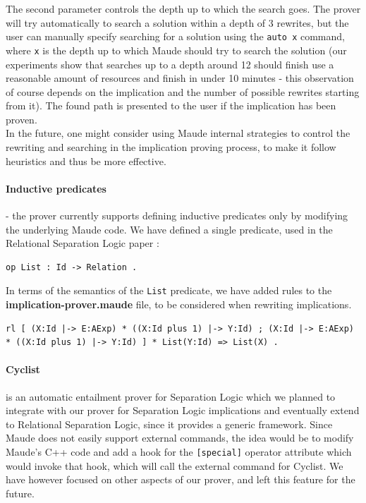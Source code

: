 \documentclass[12pt,a4paper]{article}
\begin{document}
{The second parameter controls the depth up to which the search goes. The prover will try automatically to search a solution within a depth of 3 rewrites, but the user can manually specify searching for a solution using the \texttt{auto x} command, where \texttt{x} is the depth up to which Maude should try to search the solution (our experiments show that searches up to a depth around 12 should finish use a reasonable amount of resources and finish in under 10 minutes - this observation of course depends on the implication and the number of possible rewrites starting from it). The found path is presented to the user if the implication has been proven. 
\\

In the future, one might consider using Maude internal strategies \cite{manual} to control the rewriting and searching in the implication proving process, to make it follow heuristics and thus be more effective.

\paragraph{Inductive predicates} - the prover currently supports defining inductive predicates only by modifying the underlying Maude code. We have defined a single predicate, used in the Relational Separation Logic paper \cite{relational} :
\begin{lstlisting}[caption=Predicate syntax definition]
op List : Id -> Relation . 
\end{lstlisting}
In terms of the semantics of the \texttt{List} predicate, we have added rules to the \textbf{implication-prover.maude} file, to be considered when rewriting implications.
\begin{lstlisting}[caption=Example of rule interpreting the List predicate during implication proving]
rl [ (X:Id |-> E:AExp) * ((X:Id plus 1) |-> Y:Id) ; (X:Id |-> E:AExp) * ((X:Id plus 1) |-> Y:Id) ] * List(Y:Id) => List(X) .
\end{lstlisting}
\paragraph{Cyclist}\cite{cyclist} \cite{cyclistSite} is an automatic entailment prover for Separation Logic which we planned to integrate with our prover for Separation Logic implications and eventually extend to Relational Separation Logic, since it provides a generic framework. Since Maude does not easily support external commands, the idea would be to modify Maude's C++ code and add a hook for the \texttt{[special]} operator attribute which would invoke that hook, which will call the external command for Cyclist. We have however focused on other aspects of our prover, and left this feature for the future.
}
\end{document}
